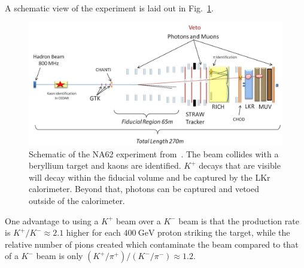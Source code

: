 A schematic view of the experiment is laid out in Fig.~\ref{fig:na62_experiment}.

\begin{figure}[h]
    \centering
    \includegraphics[width=\textwidth]{Figures/experiments/na62_schematic}
    \caption[Schematic of the NA62 experiment.]{Schematic of the NA62 experiment from~\cite{Martellotti:2015kna}. The beam collides with a beryllium target and kaons are identified. $K^+$ decays that are visible will decay within the fiducial volume and be captured by the LKr calorimeter. Beyond that, photons can be captured and vetoed outside of the calorimeter.}
    \label{fig:na62_experiment}
\end{figure}

One advantage to using a $K^+$ beam over a $K^-$ beam is that the production rate is $K^+ / K^- \approx 2.1$ higher for each $400~\textrm{GeV}$ proton striking the target, while the relative number of pions created which contaminate the beam compared to that of a $K^-$ beam is only $(K^+ / \pi^+) / (K^- / \pi^-) \approx 1.2$.
